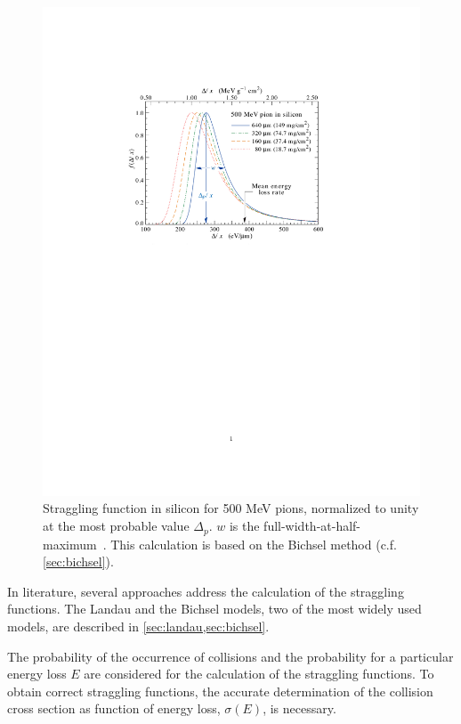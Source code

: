 \begin{figure}[htbp]
  \centering
  \includegraphics[width=\textwidth, trim = 50mm 140mm
    50mm 40mm, clip]{figures/ChargeSharing/stragglingFunction_physicsReview.pdf}

    \caption{Straggling function in silicon for 500 MeV pions,
      normalized to unity at the most probable value $\Delta_{p}$. $w$
      is the full-width-at-half-maximum~\cite{Beringer:1900zz}. This
      calculation is based on the Bichsel method
      (c.f. \cref{sec:bichsel}).}
  \label{fig:LandauDistribution}
\end{figure}

In literature, several approaches address the calculation of the
straggling functions. The Landau and the Bichsel models, two of the
most widely used models, are described in
\cref{sec:landau,sec:bichsel}.

The probability of the occurrence of collisions and the probability
for a particular energy loss $E$ are considered for the calculation of
the straggling functions. To obtain correct straggling functions, the
accurate determination of the collision cross section as function of
energy loss, $\sigma(E)$, is necessary.

